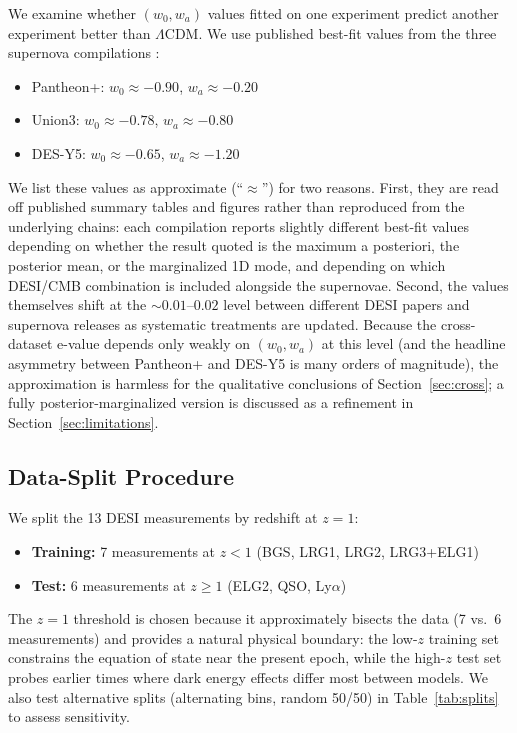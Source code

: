 \documentclass[11pt,a4paper]{article}
\newcommand{\LCDM}{$\Lambda$CDM}
\begin{document}
We examine whether $(w_0, w_a)$ values fitted on one experiment predict another experiment better than \LCDM. We use published best-fit values from the three supernova compilations \citep{DESI2025}:
\begin{itemize}
    \item Pantheon+: $w_0 \approx -0.90$, $w_a \approx -0.20$
    \item Union3: $w_0 \approx -0.78$, $w_a \approx -0.80$
    \item DES-Y5: $w_0 \approx -0.65$, $w_a \approx -1.20$
\end{itemize}
We list these values as approximate (``$\approx$'') for two reasons. First, they are read off published summary tables and figures rather than reproduced from the underlying chains: each compilation reports slightly different best-fit values depending on whether the result quoted is the maximum a posteriori, the posterior mean, or the marginalized 1D mode, and depending on which DESI/CMB combination is included alongside the supernovae. Second, the values themselves shift at the $\sim 0.01$--$0.02$ level between different DESI papers and supernova releases as systematic treatments are updated. Because the cross-dataset e-value depends only weakly on $(w_0, w_a)$ at this level (and the headline asymmetry between Pantheon+ and DES-Y5 is many orders of magnitude), the approximation is harmless for the qualitative conclusions of Section~\ref{sec:cross}; a fully posterior-marginalized version is discussed as a refinement in Section~\ref{sec:limitations}.

\subsection{Data-Split Procedure}

We split the 13 DESI measurements by redshift at $z = 1$:
\begin{itemize}
    \item \textbf{Training:} 7 measurements at $z < 1$ (BGS, LRG1, LRG2, LRG3+ELG1)
    \item \textbf{Test:} 6 measurements at $z \geq 1$ (ELG2, QSO, Ly$\alpha$)
\end{itemize}

The $z = 1$ threshold is chosen because it approximately bisects the data (7 vs.\ 6 measurements) and provides a natural physical boundary: the low-$z$ training set constrains the equation of state near the present epoch, while the high-$z$ test set probes earlier times where dark energy effects differ most between models. We also test alternative splits (alternating bins, random 50/50) in Table~\ref{tab:splits} to assess sensitivity.
\end{document}
